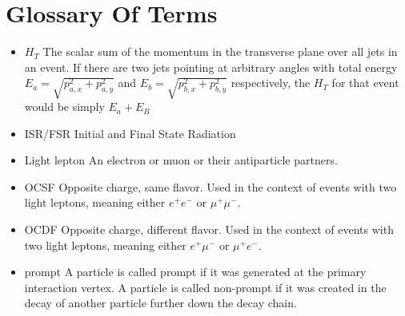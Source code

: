 \chapter{Glossary Of Terms} \label{ch:glossary}

\begin{itemize}
\item{$H_T$} The scalar sum of the momentum in the transverse plane over all jets in an event. If there are two jets pointing at arbitrary angles with total energy $E_a=\sqrt{p_{a,x}^2 + p_{a,y}^2}$ and $E_b=\sqrt{p_{b,x}^2 + p_{b,y}^2}$ respectively, the $H_T$ for that event would be simply $E_a + E_B$

\item{ISR/FSR} Initial and Final State Radiation

\item{Light lepton} An electron or muon or their antiparticle partners.

\item{OCSF} Opposite charge, same flavor. Used in the context of events with two light leptons, meaning either $e^+e^-$ or $\mu^+ \mu^-$.

\item{OCDF} Opposite charge, different flavor. Used in the context of events with two light leptons, meaning either $e^+\mu^-$ or $\mu^+ e^-$.

\item{prompt} A particle is called prompt if it was generated at the primary interaction vertex. A particle is called non-prompt if it was created in the decay of another particle further down the decay chain. 
\end{itemize}